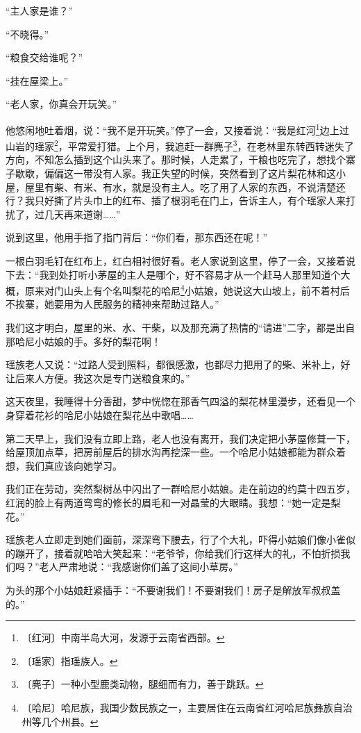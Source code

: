 \documentclass[12pt,UTF-8,openany]{ctexbook}
\begin{document}
\begin{normalsize}
    “主人家是谁？”
    
    “不晓得。”
    
    “粮食交给谁呢？”
    
    “挂在屋梁上。”
    
    “老人家，你真会开玩笑。”
    
    他悠闲地吐着烟，说：“我不是开玩笑。”停了一会，又接着说：“我是红河\footnote{〔红河〕中南半岛大河，发源于云南省西部。}边上过山岩的瑶家\footnote{〔瑶家〕指瑶族人。}，平常爱打猎。上个月，我追赶一群麂子\footnote{〔麂子〕一种小型鹿类动物，腿细而有力，善于跳跃。}，在老林里东转西转迷失了方向，不知怎么插到这个山头来了。那时候，人走累了，干粮也吃完了，想找个寨子歇歇，偏偏这一带没有人家。我正失望的时候，突然看到了这片梨花林和这小屋，屋里有柴、有米、有水，就是没有主人。吃了用了人家的东西，不说清楚还行？我只好撕了片头巾上的红布、插了根羽毛在门上，告诉主人，有个瑶家人来打扰了，过几天再来道谢……”
    
    说到这里，他用手指了指门背后：“你们看，那东西还在呢！”
    
    一根白羽毛钉在红布上，红白相衬很好看。老人家说到这里，停了一会，又接着说下去：“我到处打听小茅屋的主人是哪个，好不容易才从一个赶马人那里知道个大概，原来对门山头上有个名叫梨花的哈尼\footnote{〔哈尼〕哈尼族，我国少数民族之一，主要居住在云南省红河哈尼族彝族自治州等几个州县。}小姑娘，她说这大山坡上，前不着村后不挨寨，她要用为人民服务的精神来帮助过路人。”
    
    我们这才明白，屋里的米、水、干柴，以及那充满了热情的“请进”二字，都是出自那哈尼小姑娘的手。多好的梨花啊！
    
    瑶族老人又说：“过路人受到照料，都很感激，也都尽力把用了的柴、米补上，好让后来人方便。我这次是专门送粮食来的。”
    
    这天夜里，我睡得十分香甜，梦中恍惚在那香气四溢的梨花林里漫步，还看见一个身穿着花衫的哈尼小姑娘在梨花丛中歌唱……
    
    第二天早上，我们没有立即上路，老人也没有离开，我们决定把小茅屋修葺一下，给屋顶加点草，把房前屋后的排水沟再挖深一些。一个哈尼小姑娘都能为群众着想，我们真应该向她学习。
    
    我们正在劳动，突然梨树丛中闪出了一群哈尼小姑娘。走在前边的约莫十四五岁，红润的脸上有两道弯弯的修长的眉毛和一对晶莹的大眼睛。我想：“她一定是梨花。”
    
    瑶族老人立即走到她们面前，深深弯下腰去，行了个大礼，吓得小姑娘们像小雀似的蹦开了，接着就哈哈大笑起来：“老爷爷，你给我们行这样大的礼，不怕折损我们吗？”老人严肃地说：“我感谢你们盖了这间小草房。”
    
    为头的那个小姑娘赶紧插手：“不要谢我们！不要谢我们！房子是解放军叔叔盖的。”
    

\end{normalsize}
\end{document}
